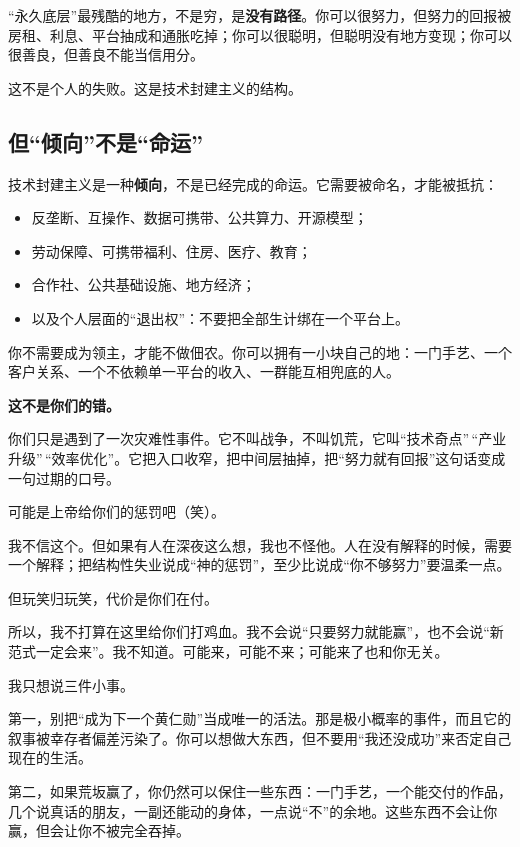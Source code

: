 ``永久底层''最残酷的地方，不是穷，是\textbf{没有路径}。你可以很努力，但努力的回报被房租、利息、平台抽成和通胀吃掉；你可以很聪明，但聪明没有地方变现；你可以很善良，但善良不能当信用分。

这不是个人的失败。这是技术封建主义的结构。

\subsection*{但``倾向''不是``命运''}\label{ux4f46ux503eux5411ux4e0dux662fux547dux8fd0}

技术封建主义是一种\textbf{倾向}，不是已经完成的命运。它需要被命名，才能被抵抗：

\begin{itemize}
\tightlist
\item
  反垄断、互操作、数据可携带、公共算力、开源模型；
\item
  劳动保障、可携带福利、住房、医疗、教育；
\item
  合作社、公共基础设施、地方经济；
\item
  以及个人层面的``退出权''：不要把全部生计绑在一个平台上。
\end{itemize}

你不需要成为领主，才能不做佃农。你可以拥有一小块自己的地：一门手艺、一个客户关系、一个不依赖单一平台的收入、一群能互相兜底的人。

\textbf{这不是你们的错。}

你们只是遇到了一次灾难性事件。它不叫战争，不叫饥荒，它叫``技术奇点''\,``产业升级''\,``效率优化''。它把入口收窄，把中间层抽掉，把``努力就有回报''这句话变成一句过期的口号。

可能是上帝给你们的惩罚吧（笑）。

我不信这个。但如果有人在深夜这么想，我也不怪他。人在没有解释的时候，需要一个解释；把结构性失业说成``神的惩罚''，至少比说成``你不够努力''要温柔一点。

但玩笑归玩笑，代价是你们在付。

所以，我不打算在这里给你们打鸡血。我不会说``只要努力就能赢''，也不会说``新范式一定会来''。我不知道。可能来，可能不来；可能来了也和你无关。

我只想说三件小事。

第一，别把``成为下一个黄仁勋''当成唯一的活法。那是极小概率的事件，而且它的叙事被幸存者偏差污染了。你可以想做大东西，但不要用``我还没成功''来否定自己现在的生活。

第二，如果荒坂赢了，你仍然可以保住一些东西：一门手艺，一个能交付的作品，几个说真话的朋友，一副还能动的身体，一点说``不''的余地。这些东西不会让你赢，但会让你不被完全吞掉。

